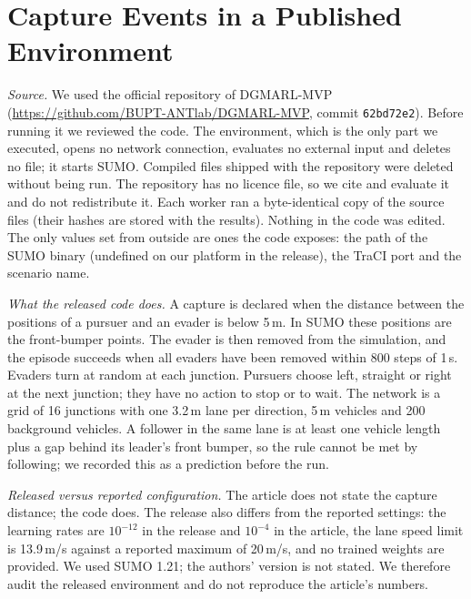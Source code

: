 \documentclass[preprint,12pt]{elsarticle}
\begin{document}
\section{Capture Events in a Published Environment}\label{sec:s-published}

\emph{Source.} We used the official repository of DGMARL-MVP \cite{li2023dgmarl}
(\url{https://github.com/BUPT-ANTlab/DGMARL-MVP}, commit \texttt{62bd72e2}). Before running it we reviewed the code.
The environment, which is the only part we executed, opens no network connection, evaluates no external input and
deletes no file; it starts SUMO. Compiled files shipped with the repository were deleted without being run. The
repository has no licence file, so we cite and evaluate it and do not redistribute it. Each worker ran a
byte-identical copy of the source files (their hashes are stored with the results). Nothing in the code was edited. The only values set
from outside are ones the code exposes: the path of the SUMO binary (undefined on our platform in the release), the
TraCI port and the scenario name.

\emph{What the released code does.} A capture is declared when the distance between the positions of a pursuer and an
evader is below 5\,m. In SUMO these positions are the front-bumper points. The evader is then removed from the
simulation, and the episode succeeds when all evaders have been removed within 800 steps of 1\,s. Evaders turn at
random at each junction. Pursuers choose left, straight or right at the next junction; they have no action to stop or
to wait. The network is a grid of 16 junctions with one 3.2\,m lane per direction, 5\,m vehicles and 200 background
vehicles. A follower in the same lane is at least one vehicle length plus a gap behind its leader's front bumper, so
the rule cannot be met by following; we recorded this as a prediction before the run.

\emph{Released versus reported configuration.} The article does not state the capture distance; the code does. The
release also differs from the reported settings: the learning rates are $10^{-12}$ in the release and $10^{-4}$ in the
article, the lane speed limit is 13.9\,m/s against a reported maximum of 20\,m/s, and no trained weights are provided.
We used SUMO 1.21; the authors' version is not stated. We therefore audit the released environment and do not
reproduce the article's numbers.
\end{document}
